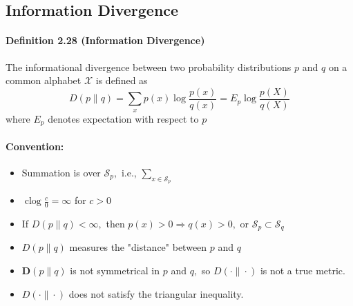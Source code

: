 \documentclass[8pt]{article}
\begin{document}
\newpage
\subsection{Information Divergence}
\begin{tcolorbox}
\paragraph{Definition 2.28 (Information Divergence)} The informational divergence between two probability distributions $p$ and $q$ on a common alphabet $\mathcal{X}$ is defined as
$$
D(p \| q)=\sum_{x} p(x) \log \frac{p(x)}{q(x)}=E_{p} \log \frac{p(X)}{q(X)}
$$
where $E_{p}$ denotes expectation with respect to $p$

\paragraph{Convention:}
\begin{itemize}
    \item Summation is over $\mathcal{S}_{p},$ i.e., $\sum_{x \in \mathcal{S}_{p}}$
    \item $\operatorname{clog} \frac{c}{0}=\infty$ for $c>0$
    \item If $D(p \| q)<\infty,$ then $p(x)>0 \Rightarrow q(x)>0,$ or $\mathcal{S}_{p} \subset \mathcal{S}_{q}$
    \item $D(p \| q)$ measures the "distance" between $p$ and $q$
    \item $\boldsymbol{D}(p \| q)$ is not symmetrical in $p$ and $q,$ so $D(\cdot \| \cdot)$ is not a true metric.
    \item $D(\cdot \| \cdot)$ does not satisfy the triangular inequality. 
\end{itemize}
\end{tcolorbox}
\end{document}
